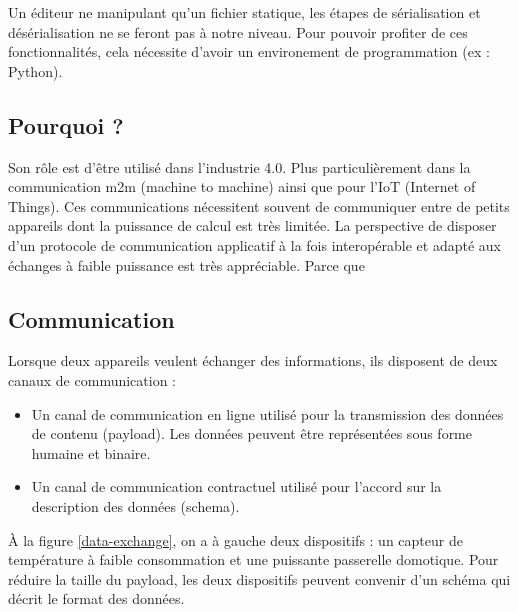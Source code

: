 \documentclass[
    iict, %
    il, %
]{heig-tb}
\begin{document}
Un éditeur ne manipulant qu'un fichier statique, les étapes de sérialisation et désérialisation ne se feront pas à notre niveau.
Pour pouvoir profiter de ces fonctionnalités, cela nécessite d'avoir un environement de programmation (ex : Python).



\subsection{Pourquoi ?}
Son rôle est d'être utilisé dans l'industrie 4.0. Plus particulièrement dans la communication m2m (machine to machine) ainsi que pour l'IoT (Internet of Things).
Ces communications nécessitent souvent de communiquer entre de petits appareils dont la puissance de calcul est très limitée.
La perspective de disposer d'un protocole de communication applicatif à la fois interopérable et adapté aux échanges à faible puissance est très appréciable.
Parce que %

\subsection{Communication}
Lorsque deux appareils veulent échanger des informations, ils disposent de deux canaux de communication :
\begin{itemize}
    \item Un canal de communication en ligne utilisé pour la transmission des données de contenu (payload). Les données peuvent être représentées sous forme humaine et binaire.
    \item Un canal de communication contractuel utilisé pour l'accord sur la description des données (schema).
\end{itemize}

\vspace{\parskip}

À la figure \ref*{data-exchange}, on a à gauche deux dispositifs : un capteur de température à faible consommation
et une puissante passerelle domotique. Pour réduire la taille du payload, les deux dispositifs peuvent convenir d'un schéma qui décrit le format des données.
\end{document}
